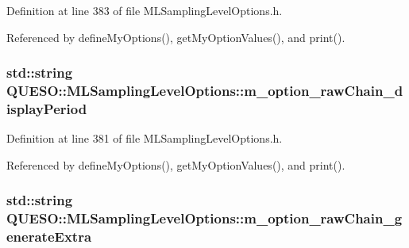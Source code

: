 Definition at line 383 of file M\-L\-Sampling\-Level\-Options.\-h.



Referenced by define\-My\-Options(), get\-My\-Option\-Values(), and print().

\hypertarget{class_q_u_e_s_o_1_1_m_l_sampling_level_options_ad71a6b65d66c81154cabef647419cff0}{
\subsubsection[{m\-\_\-option\-\_\-raw\-Chain\-\_\-display\-Period}]{\setlength{\rightskip}{0pt plus 5cm}std\-::string Q\-U\-E\-S\-O\-::\-M\-L\-Sampling\-Level\-Options\-::m\-\_\-option\-\_\-raw\-Chain\-\_\-display\-Period\hspace{0.3cm}{\ttfamily [private]}}}\label{class_q_u_e_s_o_1_1_m_l_sampling_level_options_ad71a6b65d66c81154cabef647419cff0}


Definition at line 381 of file M\-L\-Sampling\-Level\-Options.\-h.



Referenced by define\-My\-Options(), get\-My\-Option\-Values(), and print().

\hypertarget{class_q_u_e_s_o_1_1_m_l_sampling_level_options_a775bb8dfb4e5f2a0069667586eb1b336}{
\subsubsection[{m\-\_\-option\-\_\-raw\-Chain\-\_\-generate\-Extra}]{\setlength{\rightskip}{0pt plus 5cm}std\-::string Q\-U\-E\-S\-O\-::\-M\-L\-Sampling\-Level\-Options\-::m\-\_\-option\-\_\-raw\-Chain\-\_\-generate\-Extra\hspace{0.3cm}{\ttfamily [private]}}}\label{class_q_u_e_s_o_1_1_m_l_sampling_level_options_a775bb8dfb4e5f2a0069667586eb1b336}


